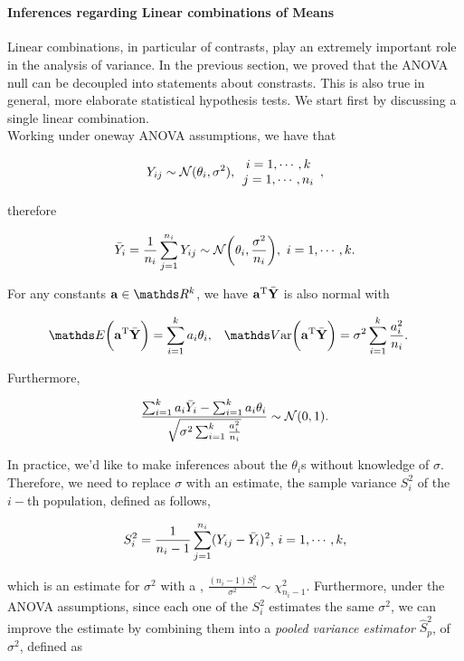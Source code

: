 \documentclass{homework}
\begin{document}
\blank \\

\paragraph{\textbf{Inferences regarding Linear combinations of Means}}

Linear combinations, in particular of contrasts, play an extremely important role in the analysis of variance. In the previous section, we proved that the ANOVA null can be decoupled into statements about constrasts. This is also true in general, more elaborate statistical hypothesis tests. We start first by discussing a single linear combination. \\

Working under oneway ANOVA assumptions, we have that

$$
Y_{ij} \sim \mathcal{N}(\theta_i, \sigma^2), \begin{array}{c}
     i = 1, \cdots, k  \\
     j = 1, \cdots, n_i 
\end{array},
$$

therefore 

$$
\Bar{Y}_i = \frac{1}{n_i}\sum_{j=1}^{n_i} Y_{ij} \sim \mathcal{N}\bigg(\theta_i, \frac{\sigma^2}{n_i}\bigg), \textnormal{ } i = 1, \cdots, k.
$$

For any constants ${\bf a} \in \R^{k}$, we have ${\bf a}^{\textnormal{T}} \bar{{\bf Y}}$ is also normal with 

\begin{align*}
    \E\bigg({\bf a}^{\textnormal{T}} \bar{{\bf Y}}\bigg) &= \sum_{i=1}^{k} a_i \theta_i, & \var \bigg({\bf a}^{\textnormal{T}} \bar{{\bf Y}}\bigg) &= \sigma^2 \sum_{i=1}^{k} \frac{a_i^2}{n_i}. 
\end{align*}

Furthermore, 

$$
\frac{\sum_{i=1}^k a_i \bar{Y}_i - \sum_{i=1}^k a_i \theta_i}{\sqrt{\sigma^2 \sum_{i=1}^{k} \frac{a_i^2}{n_i}}} \sim \mathcal{N}(0, 1).
$$

In practice, we'd like to make inferences about the $\theta_i$s without knowledge of $\sigma$. Therefore, we need to replace $\sigma$ with an estimate, the sample variance $S_i^2$ of the $i-$th population, defined as follows,

$$
S_i^2 = \frac{1}{n_i - 1} \sum_{j=1}^{n_i} (Y_{ij} - \bar{Y}_i)^2\textnormal{, } i=1, \cdots,k,  
$$

which is an estimate for $\sigma^2$ with a \chidis, $\frac{(n_i-1)S^2_i}{\sigma^2} \sim \chi^2_{n_i-1}$. Furthermore, under the ANOVA assumptions, since each one of the $S_i^2$ estimates the same $\sigma^2$, we can improve the estimate by combining them into a \textit{pooled variance estimator} $\hat{S}^2_p$, of $\sigma^2$, defined as
\end{document}
